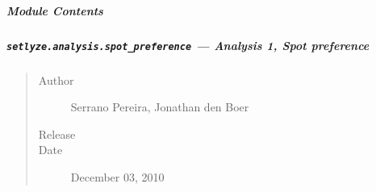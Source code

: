 \documentclass[letterpaper,10pt,english]{sphinxmanual}
\begin{document}
\subparagraph{Module Contents}
\label{setlyze/analysis/relations:module-setlyze.analysis.relations}\label{setlyze/analysis/relations:module-contents}

\subparagraph{\texttt{setlyze.analysis.spot\_preference} --- Analysis 1, Spot preference}
\label{setlyze/analysis/spot_preference:setlyze-analysis-spot-preference-analysis-1-spot-preference}\label{setlyze/analysis/spot_preference::doc}\begin{quote}\begin{description}
\item[{Author}] \leavevmode
Serrano Pereira, Jonathan den Boer

\item[{Release}] 

\item[{Date}] \leavevmode
December 03, 2010

\end{description}\end{quote}
\label{setlyze/analysis/spot_preference:module-setlyze.analysis.spot_preference}
\end{document}
